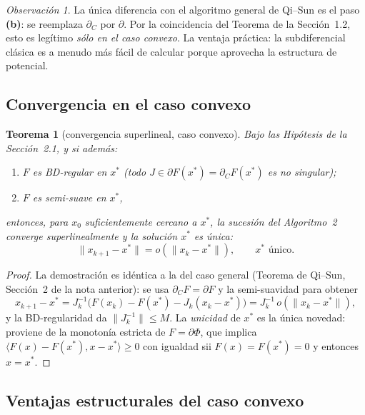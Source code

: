 \documentclass[12pt]{book}
\newcommand{\subdiffC}{\partial_C}
\newcommand{\subdiffR}{\partial}
\theoremstyle{definition}
\theoremstyle{plain}
\newtheorem{teorema}{Teorema}[section]
\theoremstyle{remark}
\newtheorem{observacion}{Observación}[section]
\begin{document}
\begin{observacion}
  La única diferencia con el algoritmo general de Qi--Sun es el
  paso \textbf{(b)}: se reemplaza $\subdiffC$ por $\subdiffR$.  Por la
  coincidencia del Teorema de la Sección~1.2, esto es legítimo
  \emph{sólo en el caso convexo}.  La ventaja práctica: la
  subdiferencial clásica es a menudo más fácil de calcular porque
  aprovecha la estructura de potencial.
\end{observacion}

\subsection{Convergencia en el caso convexo}

\begin{teorema}[convergencia superlineal, caso convexo]
  Bajo las Hipótesis de la Sección~2.1, y si además:
  \begin{enumerate}[label=\textup{(\roman*)},leftmargin=1.6em,itemsep=1pt]
    \item $F$ es BD-regular en $x^*$ (todo
          $J\in\subdiffR F(x^*)=\subdiffC F(x^*)$ es no singular);
    \item $F$ es semi-suave en $x^*$,
  \end{enumerate}
  entonces, para $x_0$ suficientemente cercano a $x^*$, la sucesión
  del Algoritmo~2 converge \emph{superlinealmente} y la solución
  $x^*$ es \emph{única}:
  \[
    \boxed{\;
    \|x_{k+1}-x^*\|=o(\|x_k-x^*\|),
    \qquad x^*\text{ único.}
    \;}
  \]
\end{teorema}

\begin{proof}
  La demostración es idéntica a la del caso general (Teorema de
  Qi--Sun, Sección~2 de la nota anterior): se usa
  $\subdiffC F=\subdiffR F$ y la semi-suavidad para obtener
  \[
    x_{k+1}-x^*=J_k^{-1}\bigl(F(x_k)-F(x^*)-J_k(x_k-x^*)\bigr)
    =J_k^{-1}\,o(\|x_k-x^*\|),
  \]
  y la BD-regularidad da $\|J_k^{-1}\|\le M$.  La \emph{unicidad} de
  $x^*$ es la única novedad: proviene de la monotonía estricta de
  $F=\subdiffR\Phi$, que implica
  $\langle F(x)-F(x^*),x-x^*\rangle\ge0$ con igualdad sii
  $F(x)=F(x^*)=0$ y entonces $x=x^*$.
\end{proof}

\subsection{Ventajas estructurales del caso convexo}
\end{document}
